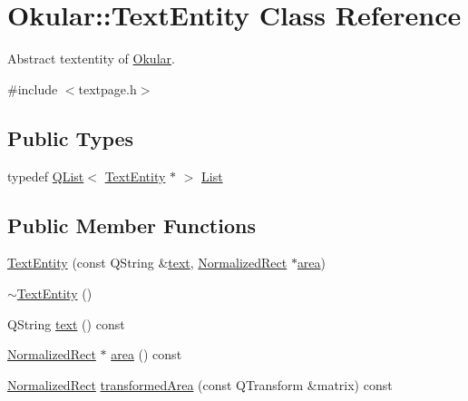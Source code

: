 \hypertarget{classOkular_1_1TextEntity}{\section{Okular\+:\+:Text\+Entity Class Reference}
\label{classOkular_1_1TextEntity}
}


Abstract textentity of \hyperlink{namespaceOkular}{Okular}.  




{\ttfamily \#include $<$textpage.\+h$>$}

\subsection*{Public Types}
\begin{DoxyCompactItemize}
\item 
typedef \hyperlink{classQList}{Q\+List}$<$ \hyperlink{classOkular_1_1TextEntity}{Text\+Entity} $\ast$ $>$ \hyperlink{classOkular_1_1TextEntity_a9deacb4422ede69001915b33ca21c023}{List}
\end{DoxyCompactItemize}
\subsection*{Public Member Functions}
\begin{DoxyCompactItemize}
\item 
\hyperlink{classOkular_1_1TextEntity_a0224f4d0bd3e3dd0e3584881a87f4bd8}{Text\+Entity} (const Q\+String \&\hyperlink{classOkular_1_1TextEntity_a401ca5d9c54d5e25bd3c8a7ce7b7092b}{text}, \hyperlink{classOkular_1_1NormalizedRect}{Normalized\+Rect} $\ast$\hyperlink{classOkular_1_1TextEntity_a6b6b48011803d2b6bff6068eec430f4b}{area})
\item 
\hyperlink{classOkular_1_1TextEntity_ab23d59f245419e3fbd3397390de5ad0b}{$\sim$\+Text\+Entity} ()
\item 
Q\+String \hyperlink{classOkular_1_1TextEntity_a401ca5d9c54d5e25bd3c8a7ce7b7092b}{text} () const 
\item 
\hyperlink{classOkular_1_1NormalizedRect}{Normalized\+Rect} $\ast$ \hyperlink{classOkular_1_1TextEntity_a6b6b48011803d2b6bff6068eec430f4b}{area} () const 
\item 
\hyperlink{classOkular_1_1NormalizedRect}{Normalized\+Rect} \hyperlink{classOkular_1_1TextEntity_abfd46cc1666c7af2c86a976916942a28}{transformed\+Area} (const Q\+Transform \&matrix) const 
\end{DoxyCompactItemize}


